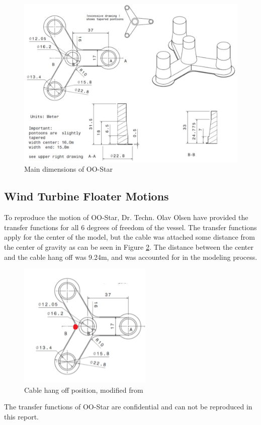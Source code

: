 \begin{figure}[H]
\centering
\includegraphics[scale=0.6]{figures/designoostar}
\caption[$\; \:$Main dimensions of OO-Star]{Main dimensions of OO-Star \cite{Lifes50+D4.2} }
 \label{fig:designoostar}
\end{figure}

\subsection{Wind Turbine Floater Motions}
To reproduce the motion of OO-Star, Dr. Techn. Olav Olsen have provided the transfer functions for all 6 degrees of freedom of the vessel. The transfer functions apply for the center of the model, but the cable was attached some distance from the center of gravity as can be seen in Figure \ref{fig:cabhang}. The distance between the center and the cable hang off was  9.24m, and was accounted for in the modeling process. 

\begin{figure}[H]
\centering
\includegraphics[scale=1.2]{figures/cabhang}
\caption[$\; \:$Cable hang off position]{Cable hang off position, modified from \cite{Lifes50+D4.2}}
 \label{fig:cabhang}
\end{figure}
 \noindent The transfer functions of OO-Star are confidential and can not be reproduced in this report. 
 
